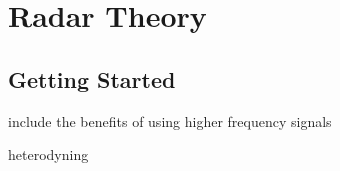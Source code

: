 \chapter{Radar Theory
\label{Radar Theory}}

\section{Getting Started}



include the benefits of using higher frequency signals

heterodyning